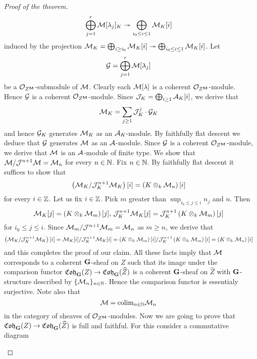 \begin{proof}[Proof of the theorem]
$$\bigoplus_{j=1}^r{\mathcal M}[\lambda_j]_K \twoheadrightarrow \bigoplus_{i_0\leq i\leq 1}{\mathcal M}_K[i]$$
induced by the projection ${\mathcal M}_K = \bigoplus_{i\geq i_0}{\mathcal M}_K[i]\twoheadrightarrow \bigoplus_{i_0\leq i\leq 1}{\mathcal M}_K[i]$. Let
$${\mathcal G} = \bigoplus_{j=1}^r{\mathcal M}[\lambda_j]$$
be a ${\mathcal O}_{Z^{\mathbf{M}}}$-submodule of ${\mathcal M}$. Clearly each ${\mathcal M}[\lambda]$ is a coherent ${\mathcal O}_{Z^{\mathbf{M}}}$-module. Hence ${\mathcal G}$ is a coherent ${\mathcal O}_{Z^{\mathbf{M}}}$-module. Since ${\mathcal J}_K = \bigoplus_{i\geq 1}{\mathcal A}_K[i]$, we derive that
$${\mathcal M}_K = \sum_{j\geq 1}{\mathcal J}_K^j\cdot {\mathcal G}_K$$
and hence ${\mathcal G}_K$ generates ${\mathcal M}_K$ as an ${\mathcal A}_K$-module. By faithfully flat descent we deduce that ${\mathcal G}$ generates ${\mathcal M}$ as an ${\mathcal A}$-module. Since ${\mathcal G}$ is a coherent ${\mathcal O}_{Z^{\mathbf{M}}}$-module, we derive that ${\mathcal M}$ is an ${\mathcal A}$-module of finite type. We show that  ${\mathcal M}/{\mathcal J}^{n+1}{\mathcal M} = {\mathcal M}_{n}$ for every $n\in {\mathbb N}$. Fix $n\in {\mathbb N}$. By faithfully flat descent it suffices to show that
$$\left({\mathcal M}_K/{\mathcal J}_K^{n+1}{\mathcal M}_K\right)[i] = \left(K\otimes_k{\mathcal M}_n\right)[i]$$
for every $i\in {\mathbb Z}$. Let us fix $i\in {\mathbb Z}$. Pick $m$ greater than $\sup_{i_0\leq j\leq i}n_j$ and $n$. Then
$${\mathcal M}_K[j] = \left(K\otimes_k{\mathcal M}_m\right)[j],\,{\mathcal J}_K^{n+1}{\mathcal M}_K[j] = {\mathcal J}_K^{n+1}\left(K\otimes_k {\mathcal M}_m\right)[j]$$
for $i_0\leq j\leq i$. Since ${\mathcal M}_m/{\mathcal J}^{n+1}{\mathcal M}_m = {\mathcal M}_n$ as $m \geq n$, we derive that
$$\left({\mathcal M}_K/{\mathcal J}_K^{n+1}{\mathcal M}_K\right)[i] = {\mathcal M}_K[i]/{\mathcal J}_K^{n+1}{\mathcal M}_K[i] = \left(K\otimes_k{\mathcal M}_m\right)[i]/{\mathcal J}_K^{n+1}\left(K\otimes_k {\mathcal M}_m\right)[i] = \left(K\otimes_k{\mathcal M}_n\right)[i]$$
and this completes the proof of our claim. All these facts imply that ${\mathcal M}$ corresponds to a coherent $\mathbf{G}$-sheaf on $Z$ such that its image under the comparison functor $\mathfrak{Coh}_{\mathbf{G}}(Z)\rightarrow \mathfrak{Coh}_{\mathbf{G}}(\widehat{Z})$ is a coherent $\mathbf{G}$-sheaf on $\widehat{Z}$ with $\mathbf{G}$-structure described by $\{{\mathcal M}_n\}_{n\in {\mathbb N}}$. Hence the comparison functor is essentialy surjective. Note also that
$${\mathcal M} = \mathrm{colim}_{n\in {\mathbb N}}{\mathcal M}_n$$
in the category of sheaves of ${\mathcal O}_{Z^{\mathbf{M}}}$-modules. Now we are going to prove that $\mathfrak{Coh}_{\mathbf{G}}(Z)\rightarrow \mathfrak{Coh}_{\mathbf{G}}(\widehat{Z})$ is full and faithful. For this consider a commutative diagram
\begin{center}
\end{center}
\end{proof}
